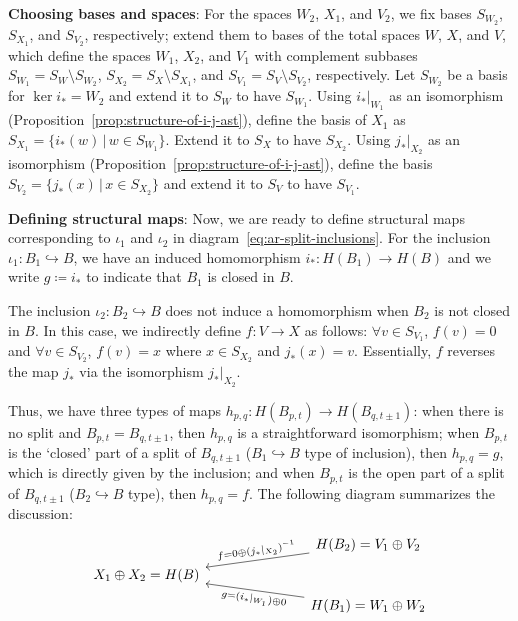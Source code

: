 \documentclass[letterpaper,11pt]{article}
\theoremstyle{plain}
\theoremstyle{definition}
\newcounter{li}
\newcommand{\idxmap}[1]{\iota_{#1}}
\newcommand{\bl}{B}
\begin{document}
{\bf Choosing bases and spaces}: 
For the spaces $W_2$, $X_1$, and $V_2$, we fix bases $S_{W_2}$, $S_{X_1}$, and $S_{V_2}$, respectively; extend them to bases of the total spaces 
$W$, $X$, and $V$, which define the spaces $W_1$, $X_2$, and $V_1$ with
complement subbases
$S_{W_1}=S_W\setminus S_{W_2}$, $S_{X_2}=S_{X}\setminus S_{X_1}$, and $S_{V_1}=S_{V}\setminus S_{V_2}$,
respectively.
Let $S_{W_2}$ be a basis for $\ker i_\ast=W_2$ and extend it to $S_{W}$
to have $S_{W_1}$.
Using $i_\ast|_{W_1}$ as an isomorphism (Proposition~\ref{prop:structure-of-i-j-ast}), define
    the basis of $X_1$ as $S_{X_1}=\{i_\ast(w)\,|\, w\in S_{W_1}\}$.
    Extend it to $S_{X}$ to have $S_{X_2}$.
Using $j_\ast|_{X_2}$ as an isomorphism (Proposition~\ref{prop:structure-of-i-j-ast}), define the basis $S_{V_2}=\{j_\ast(x)\,|\, x\in S_{X_2}\}$
and extend it to $S_{V}$ to have $S_{V_1}$.

{\bf Defining structural maps}: 
Now, we are ready to define structural maps corresponding to $\idxmap{1}$ and $\idxmap{2}$ in diagram~\eqref{eq:ar-split-inclusions}.
For the inclusion $\idxmap{1}:\bl_1\hookrightarrow \bl$, 
we have an induced homomorphism $i_*:H(\bl_1)\rightarrow H(\bl)$ and we write $g\coloneqq i_*$ to indicate that $\bl_1$ is closed in $\bl$.

The inclusion $\idxmap{2}:\bl_2\hookrightarrow \bl$ does not induce a homomorphism when $\bl_2$ is not closed in $\bl$.
In this case, we indirectly define $f: V\rightarrow X$ as follows: $\forall v\in S_{V_1}$, 
    $f(v)=0$ and
    $\forall v\in S_{V_2}$, $f(v)=x$ where $x\in S_{X_2}$ and $j_\ast(x)=v$. 
Essentially, $f$ reverses the map $j_\ast$ via the isomorphism $j_\ast|_{X_2}$. 


Thus, we have three types of maps $h_{p,q}:H(B_{p,t})\rightarrow H(B_{q,t\pm 1})$:
    when there is no split and $B_{p,t}=B_{q,t\pm 1}$, then $h_{p,q}$ is a straightforward isomorphism;
    when $B_{p,t}$ is the `closed' part of a split of $B_{q,t\pm 1}$ ($\bl_1\hookrightarrow\bl$ type of inclusion),
        then $h_{p,q}=g$, which is directly given by the inclusion;
    and when $B_{p,t}$ is the open part of a split of $B_{q,t\pm 1}$ 
        ($\bl_2\hookrightarrow\bl$ type),
        then $h_{p,q}=f$.
The following diagram summarizes the discussion:
\begin{equation}\label{eq:lefschetz_ar_split_regular}
    \begin{tikzcd}[row sep=tiny, column sep=2.5cm]
        & H(\bl_2)=V_1\oplus V_2\arrow[ld, "f=0\oplus (j_\ast|_{X_2})^{-1}",sloped]\\
        X_1\oplus X_2 = H(\bl) & \\
        & H(\bl_1)=W_1\oplus W_2\arrow[lu, "g=(i_\ast|_{W_1})\oplus 0",swap, sloped]
    \end{tikzcd}
\end{equation}
\end{document}
